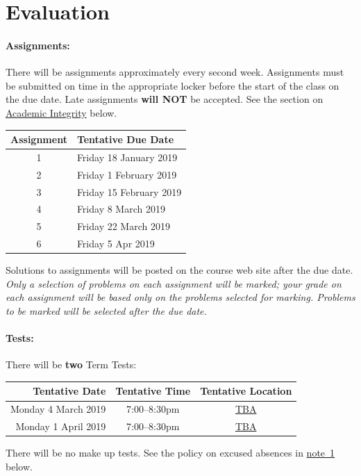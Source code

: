 \documentclass[12pt]{article}
\newcommand{\note}{\noindent{\bfseries\slshape Note:\/} }
\begin{document}
\section*{Evaluation}

\paragraph*{Assignments:} There will be assignments approximately every second week.  Assignments must be submitted on time in the appropriate locker before the start of the class on the due date.  Late assignments {\bf will NOT} be accepted.  See the section on \hyperlink{dishonesty}{Academic Integrity} below.
%
\begin{center}
\begin{tabular}{c|l}
\bf Assignment & \bf Tentative Due Date \\\hline
1 & Friday 18 January 2019 \\
2 & Friday  1 February 2019 \\
3 & Friday 15 February 2019 \\
4 & Friday  8 March 2019 \\
5 & Friday 22 March 2019 \\
6 & Friday  5 Apr 2019
\end{tabular}
\end{center}
%
Solutions to assignments will be posted on the course web site after the due date.
\note \emph{Only a selection of problems on each assignment will be marked; your grade on each assignment will be based only on the problems selected for marking.  Problems to be marked will be selected after the due date.}



\paragraph*{Tests:}

There will be {\bf two} Term Tests:
\begin{center}
\begin{tabular}{r|c|c}
\bf Tentative Date & \bf Tentative Time & \bf Tentative Location \\\hline
Monday 4 March 2019 & 7:00--8:30pm & \href{http://library.mcmaster.ca/cavs/class-dir/mdcl-1102}{TBA}\\
Monday 1 April 2019 & 7:00--8:30pm & \href{http://library.mcmaster.ca/cavs/class-dir/mdcl-1102}{TBA}
\end{tabular}
\end{center}
\noindent
There will be no make up tests. See the policy on excused absences in \hyperlink{note1}{note~1} below.
\end{document}
